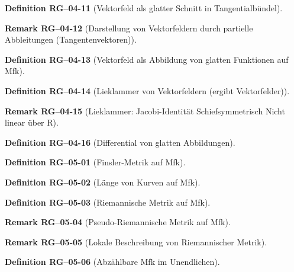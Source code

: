 \documentclass[10pt, letterpaper]{article}
\newcommand{\CustomHeading}[3]{%
  \par\medskip\noindent%
  \textbf{#1 #2} \textnormal{(#3)}.\enskip%
}
\newenvironment{DEF}[2]{\CustomHeading{Definition}{#1}{#2}}{}
\newenvironment{REM}[2]{\CustomHeading{Remark}{#1}{#2}}{}
\begin{document}
\begin{DEF}{RG--04-11}{Vektorfeld als glatter Schnitt in Tangentialbündel}
\end{DEF}

\begin{REM}{RG--04-12}{Darstellung von Vektorfeldern durch partielle Abbleitungen (Tangentenvektoren)}
\end{REM}

\begin{DEF}{RG--04-13}{Vektorfeld als Abbildung von glatten Funktionen auf Mfk}
\end{DEF}

\begin{DEF}{RG--04-14}{Lieklammer von Vektorfeldern (ergibt Vektorfelder)}
\end{DEF}

\begin{REM}{RG--04-15}{Lieklammer:
Jacobi-Identität
Schiefsymmetrisch
Nicht linear über R}
\end{REM}

\begin{DEF}{RG--04-16}{Differential von glatten Abbildungen}
\end{DEF}

\begin{DEF}{RG--05-01}{Finsler-Metrik auf Mfk}
\end{DEF}

\begin{DEF}{RG--05-02}{Länge von Kurven auf Mfk}
\end{DEF}

\begin{DEF}{RG--05-03}{Riemannische Metrik auf Mfk}
\end{DEF}

\begin{REM}{RG--05-04}{Pseudo-Riemannische Metrik auf Mfk}
\end{REM}

\begin{REM}{RG--05-05}{Lokale Beschreibung von Riemannischer Metrik}
\end{REM}

\begin{DEF}{RG--05-06}{Abzählbare Mfk im Unendlichen}
\end{DEF}
\end{document}

